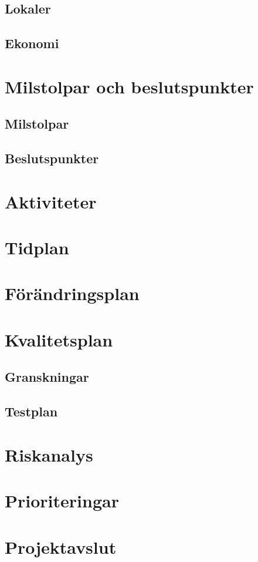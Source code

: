\documentclass[a4paper,11pt]{article}
\begin{document}
\subsection{Lokaler}

\subsection{Ekonomi}

\section{Milstolpar och beslutspunkter}
\subsection{Milstolpar}
\subsection{Beslutspunkter}

\section{Aktiviteter}

\section{Tidplan}

\section{Förändringsplan}

\section{Kvalitetsplan}

\subsection{Granskningar}

\subsection{Testplan}

\section{Riskanalys}

\section{Prioriteringar}

\section{Projektavslut}

\begin{appendices}
\end{appendices}
\end{document}

